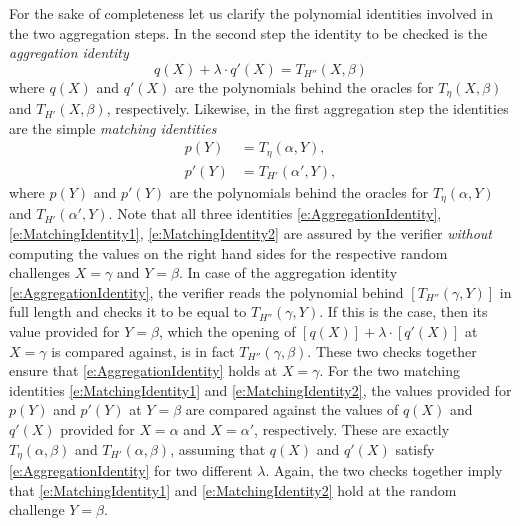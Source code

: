\documentclass[10pt,article,oneside]{memoir}
\theoremstyle{definition}
\theoremstyle{remark}
\begin{document}
For the sake of completeness let us clarify the polynomial identities involved in the two aggregation steps. %
In the second step the identity to be checked is the \textit{aggregation identity}
\begin{equation}
\label{e:AggregationIdentity}
q(X) + \lambda\cdot q'(X) = T_{H''}(X,\beta)
\end{equation}
where $q(X)$ and $q'(X)$ are the polynomials behind the oracles for $T_\eta(X,\beta)$ and $T_{H'}(X,\beta)$, respectively.
Likewise, in the first aggregation step the identities are the simple \textit{matching identities}
\begin{align}
\label{e:MatchingIdentity1}
p(Y) &= T_\eta(\alpha,Y),
\\
\label{e:MatchingIdentity2}
p'(Y) &= T_{H'}(\alpha',Y),
\end{align}
where $p(Y)$ and $p'(Y)$ are the polynomials behind the oracles for $T_\eta(\alpha,Y)$ and $T_{H'}(\alpha',Y)$.
%
Note that all three identities  \eqref{e:AggregationIdentity}, \eqref{e:MatchingIdentity1},  \eqref{e:MatchingIdentity2} are assured by the verifier \textit{without} computing the values on the right hand sides for the respective random challenges $X=\gamma$ and $Y=\beta$.
In case of the aggregation identity \eqref{e:AggregationIdentity}, the verifier reads the polynomial behind $[T_{H''}(\gamma,Y)]$ in full length and checks it to be equal to $T_{H''}(\gamma,Y)$.
If this is the case, then its value provided for $Y=\beta$, which the opening of $[q(X)]+\lambda\cdot [q'(X)]$ at $X=\gamma$ is compared against, is in fact $T_{H''}(\gamma,\beta)$.
These two checks together ensure that \eqref{e:AggregationIdentity} holds at $X=\gamma$.
For the two matching identities \eqref{e:MatchingIdentity1} and \eqref{e:MatchingIdentity2}, the values provided for $p(Y)$ and $p'(Y)$ at $Y=\beta$ are compared against the values of $q(X)$ and $q'(X)$ provided for $X=\alpha$ and $X=\alpha'$, respectively. 
These are exactly $T_\eta(\alpha,\beta)$ and  $T_{H'}(\alpha,\beta)$, assuming that $q(X)$ and $q'(X)$ satisfy \eqref{e:AggregationIdentity} for two different $\lambda$.
Again, the two checks together imply that \eqref{e:MatchingIdentity1} and \eqref{e:MatchingIdentity2} hold at the random challenge $Y=\beta$.
\end{document}
